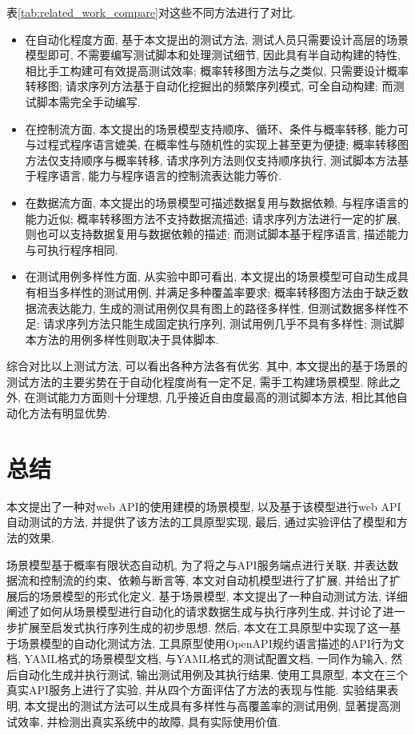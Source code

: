         表\ref{tab:related_work_compare}对这些不同方法进行了对比. 
        \begin{itemize}
            \item 在自动化程度方面, 基于本文提出的测试方法, 测试人员只需要设计高层的场景模型即可, 不需要编写测试脚本和处理测试细节, 因此具有半自动构建的特性, 相比手工构建可有效提高测试效率; 概率转移图方法与之类似, 只需要设计概率转移图; 请求序列方法基于自动化挖掘出的频繁序列模式, 可全自动构建; 而测试脚本需完全手动编写.
            
            \item 在控制流方面, 本文提出的场景模型支持顺序、循环、条件与概率转移, 能力可与过程式程序语言媲美, 在概率性与随机性的实现上甚至更为便捷; 概率转移图方法仅支持顺序与概率转移, 请求序列方法则仅支持顺序执行, 测试脚本方法基于程序语言, 能力与程序语言的控制流表达能力等价.
            
            \item 在数据流方面, 本文提出的场景模型可描述数据复用与数据依赖, 与程序语言的能力近似; 概率转移图方法不支持数据流描述; 请求序列方法进行一定的扩展, 则也可以支持数据复用与数据依赖的描述; 而测试脚本基于程序语言, 描述能力与可执行程序相同.
            
            \item 在测试用例多样性方面, 从实验中即可看出, 本文提出的场景模型可自动生成具有相当多样性的测试用例, 并满足多种覆盖率要求; 概率转移图方法由于缺乏数据流表达能力, 生成的测试用例仅具有图上的路径多样性, 但测试数据多样性不足; 请求序列方法只能生成固定执行序列, 测试用例几乎不具有多样性; 测试脚本方法的用例多样性则取决于具体脚本.
        \end{itemize}
        综合对比以上测试方法, 可以看出各种方法各有优劣. 其中, 本文提出的基于场景的测试方法的主要劣势在于自动化程度尚有一定不足, 需手工构建场景模型. 除此之外, 在测试能力方面则十分理想, 几乎接近自由度最高的测试脚本方法, 相比其他自动化方法有明显优势.
    
    \section{总结}
        本文提出了一种对web API的使用建模的场景模型, 以及基于该模型进行web API自动测试的方法, 并提供了该方法的工具原型实现, 最后, 通过实验评估了模型和方法的效果.
        
        场景模型基于概率有限状态自动机, 为了将之与API服务端点进行关联, 并表达数据流和控制流的约束、依赖与断言等, 本文对自动机模型进行了扩展, 并给出了扩展后的场景模型的形式化定义. 基于场景模型, 本文提出了一种自动测试方法, 详细阐述了如何从场景模型进行自动化的请求数据生成与执行序列生成, 并讨论了进一步扩展至启发式执行序列生成的初步思想. 然后, 本文在工具原型中实现了这一基于场景模型的自动化测试方法, 工具原型使用OpenAPI规约语言描述的API行为文档, YAML格式的场景模型文档, 与YAML格式的测试配置文档, 一同作为输入, 然后自动化生成并执行测试, 输出测试用例及其执行结果. 使用工具原型, 本文在三个真实API服务上进行了实验, 并从四个方面评估了方法的表现与性能. 实验结果表明, 本文提出的测试方法可以生成具有多样性与高覆盖率的测试用例, 显著提高测试效率, 并检测出真实系统中的故障, 具有实际使用价值.
    
